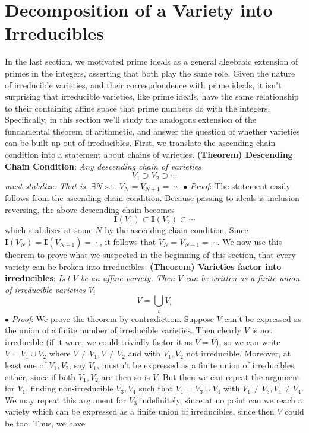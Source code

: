 \documentclass{article}
\newcommand*{\tb}{\textbf}
\newcommand*{\ti}{\textit}
\newcommand*{\n}{\newline}
\newcommand*{\nn}{\newline \newline}
\newcommand*{\Pf}{\indent \ensuremath{\bullet} \textit{Proof}: }
\newcommand*{\I}{\ensuremath{\mathbf{I}}}
\begin{document}
\section{Decomposition of a Variety into Irreducibles}
In the last section, we motivated prime ideals as a general algebraic extension of primes in the integers, asserting that both play the same role. Given the nature of irreducible varieties, and their correspdondence with prime ideals, it isn't surprising that irreducible varieties, like prime ideals, have the same relationship to their containing affine space that prime numbers do with the integers. Specifically, in this section we'll study the analogous extension of the fundamental theorem of arithmetic, and answer the question of whether varieties can be built up out of irreducibles. First, we translate the ascending chain condition into a statement about chains of varieties.
\nn
\tb{(Theorem) Descending Chain Condition}: \ti{Any descending chain of varieties}
$$ V_1 \supset V_2 \supset \cdots $$
\indent \ti{must stabilize. That is, $ \exists N \text{ s.t. } V_N = V_{N + 1} = \cdots $.}
\n
\Pf The statement easily follows from the ascending chain condition. Because passing to ideals is inclusion-reversing, the above descending chain becomes
$$ \I(V_1) \subset \I(V_2) \subset \cdots $$
which stabilizes at some $ N $ by the ascending chain condition. Since $ \I(V_N) = \I(V_{N + 1}) = \cdots $, it follows that $ V_N = V_{N + 1} = \cdots $. \qedsymbol 
\nn
We now use this theorem to prove what we suspected in the beginning of this section, that every variety can be broken into irreducibles.
\nn
\tb{(Theorem) Varieties factor into irreducibles}: \ti{Let $ V $ be an affine variety. Then $ V $ can be written as a finite union of irreducible varieties $ V_i $}
$$ V = \bigcup_{i} V_i $$
\Pf We prove the theorem by contradiction. Suppose $ V $ can't be expressed as the union of a finite number of irreducible varieties. Then clearly $ V $ is not irreducible (if it were, we could trivially factor it as $ V = V $), so we can write $ V = V_1 \cup V_2 $ where $ V \neq V_1, V \neq V_2 $ and with $ V_1, V_2 $ not irreducible. Moreover, at least one of $ V_1, V_2 $, say $ V_1 $, mustn't be expressed as a finite union of irreducibles either, since if both $ V_1, V_2 $ are then so is $ V $. But then we can repeat the argument for $ V_1 $, finding non-irreducible $ V_3, V_4 $ such that $ V_1 = V_3 \cup V_4 $ with $ V_1 \neq V_3, V_1 \neq V_4 $. We may repeat this argument for $ V_3 $ indefinitely, since at no point can we reach a variety which can be expressed as a finite union of irreducibles, since then $ V $ could be too. Thus, we have
\end{document}
